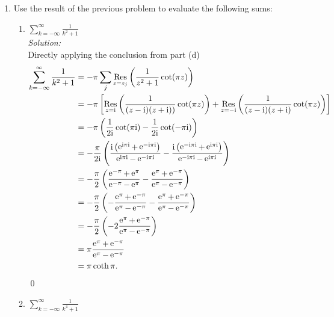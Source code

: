 \documentclass[10pt]{amsart}
\newcommand{\I}{\mathrm{i}}
\DeclareMathOperator{\E}{e}
\theoremstyle{nonumberplain}
\begin{document}
\begin{enumerate}[label={\bf {\arabic*}:}]
\begin{enumerate}
\newpage

\item Use the result of the previous problem to evaluate the following sums:
\begin{enumerate}
\item  $\displaystyle \sum_{k=-\infty}^{\infty} \frac{1}{k^2+1}$ \\
 
\noindent
\textit{Solution:} \\
Directly applying the conclusion from part (d)
\begin{align*}
\sum_{k=-\infty}^{\infty} \frac{1}{k^2 + 1}
	&= - \pi \sum_j \underset{z=z_j}{ \rm Res} \left( \frac{1}{z^2 + 1} \cot (\pi z) \right) \\
	&= - \pi \left[
		\underset{z=\I}{ \rm Res} \left( \frac{1}{(z - \I)(z + \I))} \cot (\pi z) \right)
		+ \underset{z=-\I}{ \rm Res} \left( \frac{1}{(z - \I)(z + \I)} \cot (\pi z) \right)
		\right] \\
	&= - \pi \left( \frac{1}{2\I} \cot (\pi \I) - \frac{1}{2\I} \cot (- \pi \I) \right) \\
	&= - \frac{\pi} {2\I} \left( \frac {\I \left( \E^{\I \pi \I} + \E^{-\I \pi \I} \right) } {\E^{\I \pi \I} - \E^{-\I \pi \I} } - \frac {\I \left( \E^{- \I \pi \I} + \E^{\I \pi \I} \right) } {\E^{- \I \pi \I} - \E^{\I \pi \I} } \right) \\
	&= - \frac \pi 2 \left( \frac { \E^{-\pi} + \E^{\pi} } {\E^{- \pi } - \E^{ \pi } } - \frac { \E^{ \pi } + \E^{- \pi } } {\E^{ \pi } - \E^{- \pi } } \right) \\
	&= - \frac \pi 2 \left( - \frac { \E^{\pi} + \E^{-\pi} } { \E^{ \pi } - \E^{- \pi } } - \frac { \E^{ \pi } + \E^{- \pi } } {\E^{ \pi } - \E^{- \pi } } \right) \\
	&= - \frac \pi 2 \left( - 2 \frac { \E^{ \pi } + \E^{- \pi } } {\E^{ \pi } - \E^{- \pi } } \right) \\
	&= \pi \frac { \E^{ \pi } + \E^{- \pi } } {\E^{ \pi } - \E^{- \pi } } \\
	&= \pi \coth{\pi}.
\end{align*}
\qed \\

\item  $\displaystyle \sum_{k=-\infty}^{\infty} \frac{1}{k^4+1}$ \\
 

\end{enumerate}
\end{enumerate}
\end{enumerate}
\end{document}
